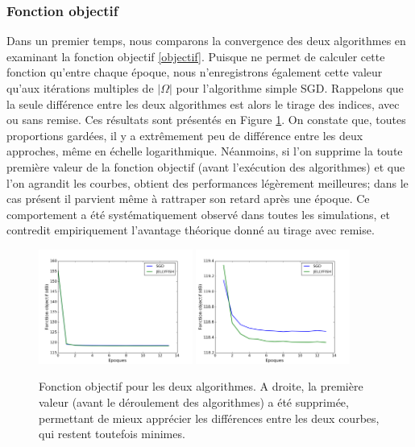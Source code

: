 \documentclass[10pt,a4paper]{article}
\begin{document}
\subsubsection*{Fonction objectif}
Dans un premier temps, nous comparons la convergence des deux algorithmes en examinant la fonction objectif \eqref{objectif}. Puisque \jel ne permet de calculer cette fonction qu'entre chaque époque, nous n'enregistrons également cette valeur qu'aux itérations multiples de $|\Omega|$ pour l'algorithme simple SGD. Rappelons que la seule différence entre les deux algorithmes est alors le tirage des indices, avec ou sans remise. Ces résultats sont présentés en Figure \ref{obj_samp}. On constate que, toutes proportions gardées, il y a extrêmement peu de différence entre les deux approches, même en échelle logarithmique. Néanmoins, si l'on supprime la toute première valeur de la fonction objectif (avant l'exécution des algorithmes) et que l'on agrandit les courbes, \jel obtient des performances légèrement meilleures; dans le cas présent il parvient même à rattraper son retard après une époque. Ce comportement a été systématiquement observé dans toutes les simulations, et contredit empiriquement l'avantage théorique donné au tirage avec remise.

\begin{figure}[h]
\centering
\includegraphics[width=0.45\textwidth]{fig/obj_samp1}
\includegraphics[width=0.45\textwidth]{fig/obj_samp2}
\caption{Fonction objectif pour les deux algorithmes. A droite, la première valeur (avant le déroulement des algorithmes) a été supprimée, permettant de mieux apprécier les différences entre les deux courbes, qui restent toutefois minimes.}
\label{obj_samp}
\end{figure}
\end{document}
